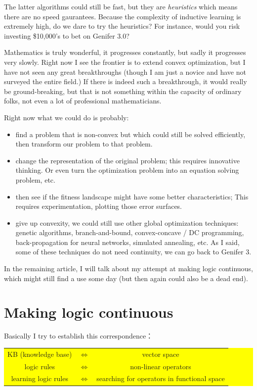 \documentclass[12pt]{article}
\begin{document}
The latter algorithms could still be fast, but they are \textit{heuristics} which means there are no speed gaurantees.  Because the complexity of inductive learning is extremely high, do we dare to try the heuristics?  For instance, would you risk investing \$10,000's to bet on Genifer 3.0?

Mathematics is truly wonderful, it progresses constantly, but sadly it progresses very slowly.  Right now I see the frontier is to extend convex optimization, but I have not seen any great breakthroughs (though I am just a novice and have not surveyed the entire field.)  If there is indeed such a breakthrough, it would really be ground-breaking, but that is not something within  the capacity of ordinary folks, not even a lot of professional mathematicians.

Right now what we could do is probably:
\begin{itemize}
\item find a problem that is non-convex but which could still be solved efficiently, then transform our problem to that problem.
\item change the representation of the original problem;  this requires innovative thinking.  Or even turn the optimization problem into an equation solving problem, etc.
\item then see if the fitness landscape might have some better characteristics;  This requires experimentation, plotting those error surfaces.
\item give up convexity, we could still use other global optimization techniques:  genetic algorithms, branch-and-bound, convex-concave / DC programming, back-propagation for neural networks, simulated annealing, etc.  As I said, some of these techniques do not need continuity, we can go back to Genifer 3.
\end{itemize}

In the remaining article, I will talk about my attempt at making logic continuous, which might still find a use some day (but then again could also be a dead end).

\section{Making logic continuous}

Basically I try to establish this correspondence：
\begin{center}
\colorbox{yellow}{\parbox{0.95\textwidth}{
\begin{tabular}{ccc}
KB (knowledge base) & $\Leftrightarrow$ & vector space \\
logic rules & $\Leftrightarrow$ & non-linear operators \\
learning logic rules & $\Leftrightarrow$ & searching for operators in functional space \\ 
\end{tabular}
}}
\end{center}
\end{document}
